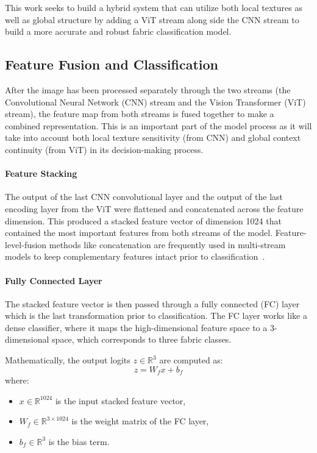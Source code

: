 This work seeks to build a hybrid system that can utilize both local textures as well as global structure by adding a ViT stream along side the CNN stream to build a more accurate and robust fabric classification model.

\subsection{Feature Fusion and Classification}

After the image has been processed separately through the two streams (the Convolutional Neural Network (CNN) stream and the Vision Transformer (ViT) stream), the feature map from both streams is fused together to make a combined representation. This is an important part of the model process as it will take into account both local texture sensitivity (from CNN) and global context continuity (from ViT) in its decision-making process.

\paragraph{Feature Stacking}

The output of the last CNN convolutional layer and the output of the last encoding layer from the ViT were flattened and concatenated across the feature dimension. This produced a stacked feature vector of dimension 1024 that contained the most important features from both streams of the model. Feature-level-fusion methods like concatenation are frequently used in multi-stream models to keep complementary features intact prior to classification~\cite{zhong2023textilenet, chitra2023fabric, xu2018multichannel}.

\paragraph{Fully Connected Layer}

The stacked feature vector is then passed through a fully connected (FC) layer which is the last transformation prior to classification. The FC layer works like a dense classifier, where it maps the high-dimensional feature space to a 3-dimensional space, which corresponds to three fabric classes.

Mathematically, the output logits \( z \in \mathbb{R}^3 \) are computed as:
\[
z = W_f x + b_f
\]
where:
\begin{itemize}[noitemsep,topsep=0pt]
    \item \( x \in \mathbb{R}^{1024} \) is the input stacked feature vector,
    \item \( W_f \in \mathbb{R}^{3 \times 1024} \) is the weight matrix of the FC layer,
    \item \( b_f \in \mathbb{R}^{3} \) is the bias term.
\end{itemize}

